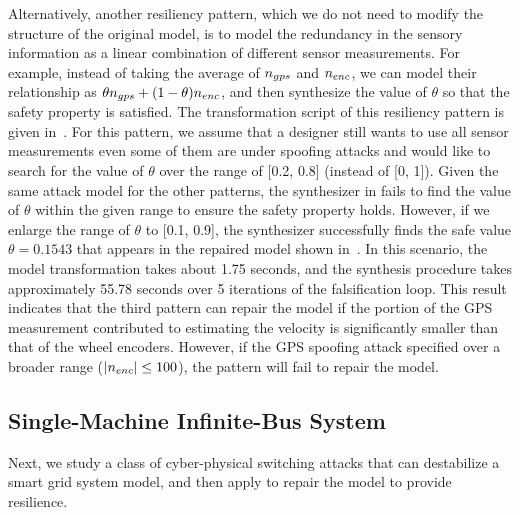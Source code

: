Alternatively, another resiliency pattern, which we do not need to modify the structure of the original model, is to model the redundancy in the sensory information as a linear combination of different sensor measurements. For example, instead of taking the average of $n_{gps}$ and $n_{enc}$, we can model their relationship as $\theta n_{gps} + (1-\theta)n_{enc}$, and then synthesize the value of $\theta$ so that the safety property is satisfied. The transformation script of this resiliency pattern is given in~. For this pattern, we assume that a designer still wants to use all sensor measurements even some of them are under spoofing attacks and would like to search for the value of $\theta$ over the range of [0.2, 0.8] (instead of [0, 1]). Given the same attack model for the other patterns, the synthesizer in \toolreaffirm fails to find the value of $\theta$ within the given range to ensure the safety property holds. However, if we enlarge the range of $\theta$ to [0.1, 0.9], the synthesizer successfully finds the safe value $\theta = 0.1543$ that appears in the repaired model shown in~. In this scenario, the model transformation takes about 1.75 seconds, and the synthesis procedure takes approximately 55.78 seconds over 5 iterations of the falsification loop.    
%
This result indicates that the third pattern can repair the model if the portion of the GPS measurement contributed to estimating the velocity is significantly smaller than that of the wheel encoders. However, if the GPS spoofing attack specified over a broader range (\eg $|n_{enc}| \leq 100$), the pattern will fail to repair the model.          









\subsection{Single-Machine Infinite-Bus System}
%

Next, we study a class of cyber-physical switching attacks that can destabilize a smart grid system model, and then apply \toolreaffirm to repair the model to provide resilience. 

